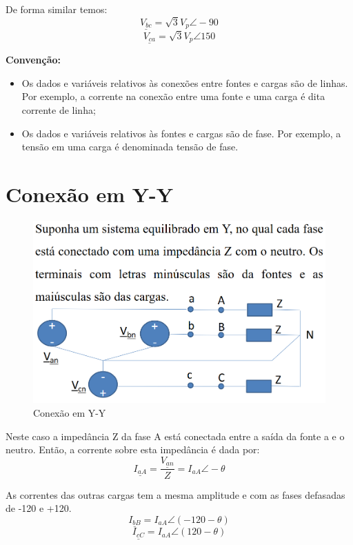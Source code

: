 \documentclass[a4paper, 12pt]{article}
\begin{document}
	De forma similar temos:
		\begin{equation}
			\underline{V_{bc}} = \sqrt{3}V_p \angle -90
		\end{equation}
		\begin{equation}
			\underline{V_{ca}} = \sqrt{3}V_p \angle 150
		\end{equation}

	\textbf{Convenção:}
	\begin{itemize}
		\item Os dados e variáveis relativos às conexões entre fontes e cargas são de linhas. Por exemplo, a corrente na conexão entre uma fonte e uma carga é dita corrente de linha;
		\item Os dados e variáveis relativos às fontes e cargas são de fase. Por exemplo, a tensão em uma carga é denominada tensão de fase.
	\end{itemize}

\newpage
\section{Conexão em Y-Y}
	\begin{figure}[h]
		\centering
		\includegraphics[scale=0.3]{a3.png}
		\caption{Conexão em Y-Y}
	\end{figure}
	Neste caso a impedância Z da fase A está conectada entre a saída da fonte a e o neutro. Então, a corrente sobre esta impedância é dada por:
	\begin{equation}
		\underline{I_{aA}} = \frac{\underline{V_{an}}}{Z} = I_{aA}\angle - \theta
	\end{equation}

	As correntes das outras cargas tem a mesma amplitude e com as fases defasadas de -120 e +120.
	\begin{equation}
		\underline{I_{bB}} = I_{aA} \angle (-120 - \theta)
	\end{equation}
	\begin{equation}
		\underline{I_{cC}} = I_{aA} \angle (120-\theta)
	\end{equation}
\end{document}
